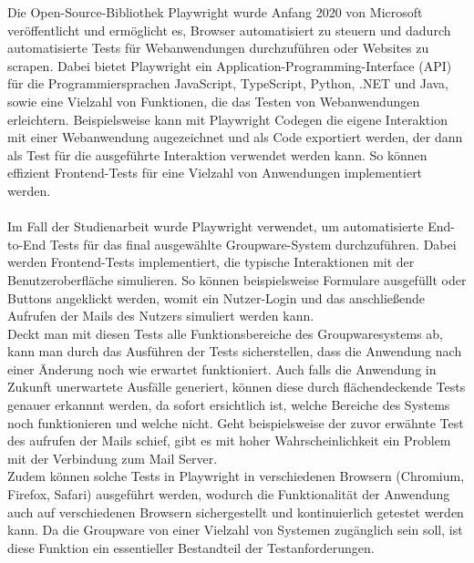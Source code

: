 Die Open-Source-Bibliothek Playwright wurde Anfang 2020 von Microsoft veröffentlicht und ermöglicht es, Browser automatisiert zu steuern und dadurch automatisierte Tests für Webanwendungen durchzuführen oder Websites zu scrapen.
Dabei bietet Playwright ein Application-Programming-Interface (API) für die Programmiersprachen JavaScript, TypeScript, Python, .NET und Java, sowie eine Vielzahl von Funktionen, die das Testen von Webanwendungen erleichtern.
Beispielsweise kann mit Playwright Codegen die eigene Interaktion mit einer Webanwendung augezeichnet und als Code exportiert werden, der dann als Test für die ausgeführte Interaktion verwendet werden kann.
So können effizient Frontend-Tests für eine Vielzahl von Anwendungen implementiert werden.
\autocite[Quelle:][]{playwright}
\\
\\
Im Fall der Studienarbeit wurde Playwright verwendet, um automatisierte End-to-End Tests für das final ausgewählte Groupware-System durchzuführen.
Dabei werden Frontend-Tests implementiert, die typische Interaktionen mit der Benutzeroberfläche simulieren.
So können beispielsweise Formulare ausgefüllt oder Buttons angeklickt werden, womit ein Nutzer-Login und das anschließende Aufrufen der Mails des Nutzers simuliert werden kann.
\\
Deckt man mit diesen Tests alle Funktionsbereiche des Groupwaresystems ab, kann man durch das Ausführen der Tests sicherstellen, dass die Anwendung nach einer Änderung noch wie erwartet funktioniert.
Auch falls die Anwendung in Zukunft unerwartete Ausfälle generiert, können diese durch flächendeckende Tests genauer erkannnt werden, da sofort ersichtlich ist, welche Bereiche des Systems noch funktionieren und welche nicht.
Geht beispielsweise der zuvor erwähnte Test des aufrufen der Mails schief, gibt es mit hoher Wahrscheinlichkeit ein Problem mit der Verbindung zum Mail Server.
\\
Zudem können solche Tests in Playwright in verschiedenen Browsern (Chromium, Firefox, Safari) ausgeführt werden, wodurch die Funktionalität der Anwendung auch auf verschiedenen Browsern sichergestellt und kontinuierlich getestet werden kann.
Da die Groupware von einer Vielzahl von Systemen zugänglich sein soll, ist diese Funktion ein essentieller Bestandteil der Testanforderungen.








